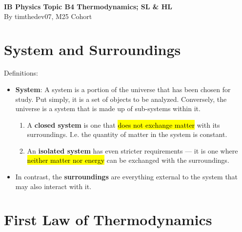 \documentclass[a4paper,12pt]{article}
\let\oldsection\section
\renewcommand\section{\clearpage\oldsection}
\begin{document}
\pagestyle{fancy}


\begin{titlepage}
  \begin{center}

    \vspace*{8cm}
    \textbf{\Large {IB Physics Topic B4 Thermodynamics; SL \& HL}} \\
    \vspace*{1cm}
    \large{By timthedev07, M25 Cohort}

  \end{center}
\end{titlepage}

\pagebreak
\tableofcontents
\pagebreak

\clearpage
\setcounter{page}{1}

\section{System and Surroundings}

Definitions:
\begin{itemize}
  \item \textbf{System}: A system is a portion of the universe that has been chosen for study. Put simply, it is a set of objects to be analyzed. Conversely, the universe is a system that is made up of sub-systems within it.
        \begin{enumerate}
          \item A \textbf{closed system} is one that \hl{does not exchange matter} with its surroundings. I.e. the quantity of matter in the system is constant.
          \item An \textbf{isolated system} has even stricter requirements --- it is one where \hl{neither matter nor energy} can be exchanged with the surroundings.
        \end{enumerate}
  \item In contrast, the \textbf{surroundings} are everything external to the system that may also interact with it.
\end{itemize}

\section{First Law of Thermodynamics}
\end{document}
